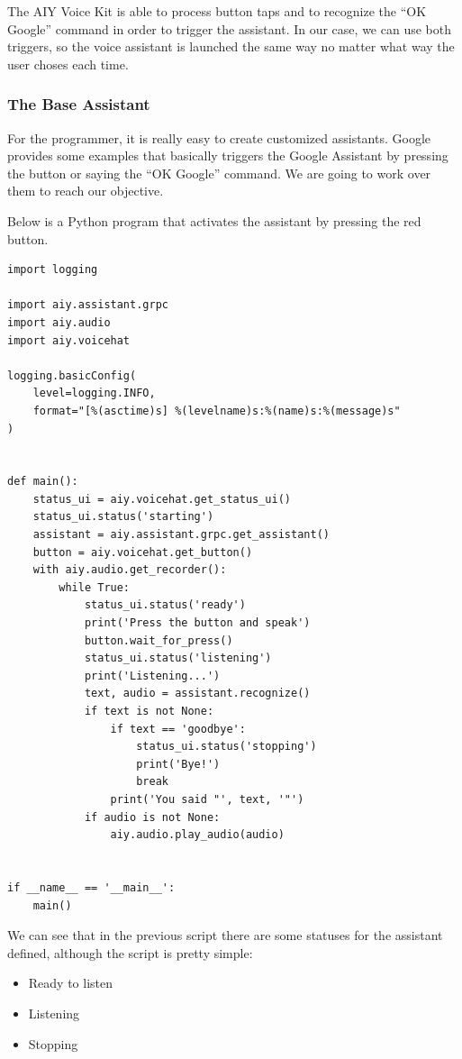 The AIY Voice Kit is able to process button taps and to recognize the “OK Google” command in order to trigger the assistant. In
our case, we can use both triggers, so the voice assistant is launched the same way no matter what way the user choses each time.

\subsubsection{The Base Assistant}
For the programmer, it is really easy to create customized assistants. Google provides some examples that basically triggers the
Google Assistant by pressing the button or saying the “OK Google” command. We are going to work over them to reach our objective.

Below is a Python program that activates the assistant by pressing the red button.

\begin{lstlisting}[style=PythonCode]
import logging

import aiy.assistant.grpc
import aiy.audio
import aiy.voicehat

logging.basicConfig(
    level=logging.INFO,
    format="[%(asctime)s] %(levelname)s:%(name)s:%(message)s"
)


def main():
	status_ui = aiy.voicehat.get_status_ui()
	status_ui.status('starting')
	assistant = aiy.assistant.grpc.get_assistant()
	button = aiy.voicehat.get_button()
	with aiy.audio.get_recorder():
        while True:
            status_ui.status('ready')
            print('Press the button and speak')
            button.wait_for_press()
            status_ui.status('listening')
            print('Listening...')
            text, audio = assistant.recognize()
            if text is not None:
                if text == 'goodbye':
                    status_ui.status('stopping')
                    print('Bye!')
                    break
                print('You said "', text, '"')
            if audio is not None:
                aiy.audio.play_audio(audio)


if __name__ == '__main__':
    main()
\end{lstlisting}

We can see that in the previous script there are some statuses for the assistant defined, although the script is pretty simple:
\begin{itemize}
    \item Ready to listen
    \item Listening
    \item Stopping
\end{itemize}

